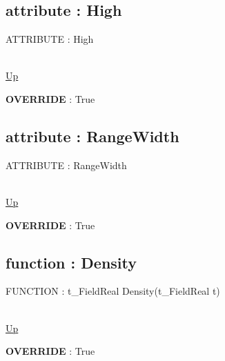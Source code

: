 \subsection*{attribute : High}
\hypertarget{ecldoc:linearregression.ols.fdistribution.high}{ATTRIBUTE : High} \\
\hyperlink{ecldoc:linearregression.ols.fdistribution}{Up} \\
\par
\textbf{OVERRIDE} : True \\
\subsection*{attribute : RangeWidth}
\hypertarget{ecldoc:linearregression.ols.fdistribution.rangewidth}{ATTRIBUTE : RangeWidth} \\
\hyperlink{ecldoc:linearregression.ols.fdistribution}{Up} \\
\par
\textbf{OVERRIDE} : True \\
\subsection*{function : Density}
\hypertarget{ecldoc:linearregression.ols.fdistribution.density}{FUNCTION : t\_FieldReal Density(t\_FieldReal t)} \\
\hyperlink{ecldoc:linearregression.ols.fdistribution}{Up} \\
\par
\textbf{OVERRIDE} : True \\

